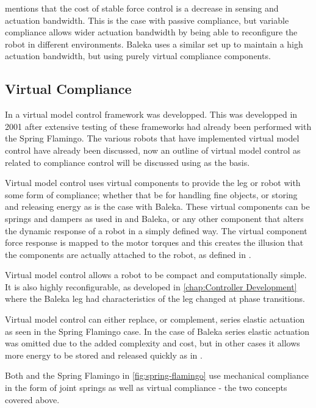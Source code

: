 \cite{Kenneally2014} mentions that the cost of stable force control is a decrease in sensing and actuation bandwidth. This is the case with passive compliance, but variable compliance allows wider actuation bandwidth by being able to reconfigure the robot in different environments. Baleka uses a similar set up to maintain a high actuation bandwidth, but using purely virtual compliance components.

\subsection{Virtual Compliance}

In \cite{Pratt2001} a virtual model control framework was developped. This was developped in 2001 after extensive testing of these frameworks had already been performed with the Spring Flamingo. The various robots that have implemented virtual model control have already been discussed, now an outline of virtual model control as related to compliance control will be discussed using \cite{Pratt2001} as the basis.

Virtual model control uses virtual components to provide the leg or robot with some form of compliance;\cite{Pratt2001} whether that be for handling fine objects, or storing and releasing energy as is the case with Baleka. These virtual components can be springs and dampers as used in \cite{Kalouche2016} and Baleka, or any other component that alters the dynamic response of a robot in a simply defined way. The virtual component force response is mapped to the motor torques and this creates the illusion that the components are actually attached to the robot, as defined in \cite{Pratt2001}. 

Virtual model control allows a robot to be compact and computationally simple.\cite{Pratt2001} It is also highly reconfigurable, as developed in \cref{chap:Controller Development} where the Baleka leg had characteristics of the leg changed at phase transitions. 

Virtual model control can either replace, or complement, series elastic actuation as seen in the Spring Flamingo case.\cite{Pratt2001} In the case of Baleka series elastic actuation was omitted due to the added complexity and cost, but in other cases it allows more energy to be stored and released quickly as in \cite{Duperret}.

Both \cite{Duperret} and the Spring Flamingo in \cref{fig:spring-flamingo} use mechanical compliance in the form of joint springs as well as virtual compliance - the two concepts covered above.

